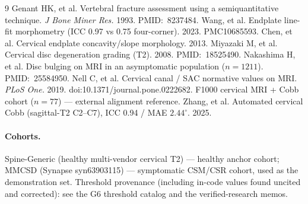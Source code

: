 \documentclass[11pt]{article}
\begin{document}
\begin{thebibliography}{9}
 Genant HK, et al. Vertebral fracture assessment using a semiquantitative technique.
\emph{J Bone Miner Res.} 1993. PMID:~8237484.
 Wang, et al. Endplate line-fit morphometry (ICC 0.97 vs 0.75 four-corner). 2023.
PMC10685593.
 Chen, et al. Cervical endplate concavity/slope morphology. 2013.
 Miyazaki M, et al. Cervical disc degeneration grading (T2). 2008. PMID:~18525490.
 Nakashima H, et al. Disc bulging on MRI in an asymptomatic population ($n=1211$).
PMID:~25584950.
 Nell C, et al. Cervical canal / SAC normative values on MRI. \emph{PLoS One.} 2019.
doi:10.1371/journal.pone.0222682.
 F1000 cervical MRI + Cobb cohort ($n=77$) --- external alignment reference.
 Zhang, et al. Automated cervical Cobb (sagittal-T2 C2--C7), ICC 0.94 / MAE
$2.44^\circ$. 2025.
\end{thebibliography}

\paragraph{Cohorts.} Spine-Generic (healthy multi-vendor cervical T2) --- healthy anchor cohort; MMCSD
(Synapse syn63903115) --- symptomatic CSM/CSR cohort, used as the demonstration set. Threshold
provenance (including in-code values found uncited and corrected): see the G6 threshold catalog and the
verified-research memos.
\end{document}

